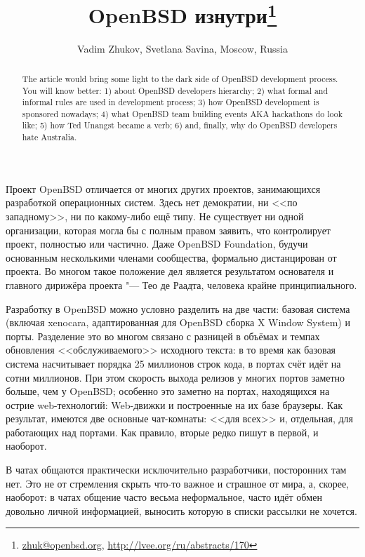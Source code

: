 \documentclass[10pt, a5paper]{article}
\begin{document}
\title{OpenBSD изнутри\footnote{\url{zhuk@openbsd.org}, \url{http://lvee.org/ru/abstracts/170}}}
\author{Vadim Zhukov, Svetlana Savina, Moscow, Russia}
\maketitle
\begin{abstract}
The article would bring some light to the dark side of OpenBSD development process. You will know better: 1) about OpenBSD developers hierarchy; 2) what formal and informal rules are used in development process; 3) how OpenBSD development is sponsored nowadays; 4) what OpenBSD team building events AKA hackathons do look like; 5) how Ted Unangst became a verb; 6) and, finally, why do OpenBSD developers hate Australia.
\end{abstract}
Проект OpenBSD отличается от многих других проектов, занимающихся разработкой операционных систем. Здесь нет демократии, ни <<по западному>>, ни по какому-либо ещё типу. Не существует ни одной организации, которая могла бы с полным правом заявить, что контролирует проект, полностью или частично. Даже OpenBSD Foundation, будучи основанным несколькими членами сообщества, формально дистанцирован от проекта. Во многом такое положение дел является результатом основателя и главного дирижёра проекта "--- Тео де Раадта, человека крайне принципиального.

Разработку в OpenBSD можно условно разделить на две части: базовая система (включая xenocara, адаптированная для OpenBSD сборка X Window System) и порты. Разделение это во многом связано с разницей в объёмах и темпах обновления <<обслуживаемого>> исходного текста: в то время как базовая система насчитывает порядка 25 миллионов строк кода, в портах счёт идёт на сотни миллионов. При этом скорость выхода релизов у многих портов заметно больше, чем у OpenBSD; особенно это заметно на портах, находящихся на острие web-технологий: Web-движки и построенные на их базе браузеры. Как результат, имеются две основные чат-комнаты: <<для всех>> и, отдельная, для работающих над портами. Как правило, вторые редко пишут в первой, и наоборот.

В чатах общаются практически исключительно разработчики, посторонних там нет. Это не от стремления скрыть что-то важное и страшное от мира, а, скорее, наоборот: в чатах общение часто весьма неформальное, часто идёт обмен довольно личной информацией, выносить которую в списки рассылки не хочется.
\end{document}
